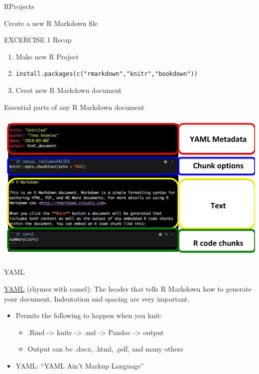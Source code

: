 \documentclass[
  ignorenonframetext,
]{beamer}
\providecommand{\tightlist}{%
  \setlength{\itemsep}{0pt}\setlength{\parskip}{0pt}}
\begin{document}
\begin{frame}[fragile]{RProjects}
\begin{block}{Create a new R Markdown file}
\end{block}

\begin{block}{EXCERCISE 1 \textbar{} Recap}

\begin{enumerate}
\tightlist
\item
  Make new R Project
\item
  \texttt{install.packages(c("rmarkdown","knitr","bookdown"))}
\item
  Creat new R Markdown document
\end{enumerate}

\end{block}

\begin{block}{Essential parts of any R Markdown document}

\includegraphics{images/rmarkdown_parts.png}

\end{block}

\begin{block}{YAML}

\href{https://en.wikipedia.org/wiki/YAML}{YAML} (rhymes with camel): The
header that tells R Markdown how to generate your document. Indentation
and spacing are very important.

\begin{itemize}
\tightlist
\item
  Permits the following to happen when you knit:

  \begin{itemize}
  \tightlist
  \item
    .Rmd -\textgreater{} knitr -\textgreater{} .md -\textgreater{}
    Pandoc -\textgreater{} output
  \item
    Output can be .docx, .html, .pdf, and many others
  \end{itemize}
\item
  YAML: ``YAML Ain't Markup Language''
\end{itemize}


\end{block}
\end{frame}
\end{document}
